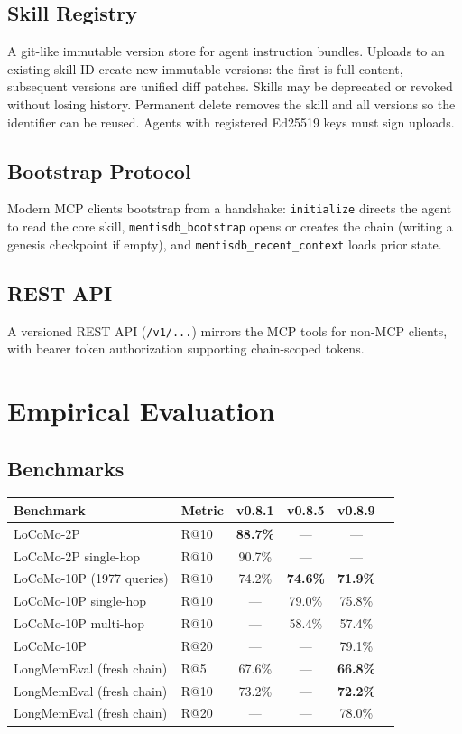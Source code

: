 \documentclass[11pt,a4paper]{article}
\begin{document}
\subsection{Skill Registry}

A git-like immutable version store for agent instruction bundles. Uploads to an existing
skill ID create new immutable versions: the first is full content, subsequent versions are
unified diff patches. Skills may be deprecated or revoked without losing history.
Permanent delete removes the skill and all versions so the identifier can be reused.
Agents with registered Ed25519 keys must sign uploads.

\subsection{Bootstrap Protocol}

Modern MCP clients bootstrap from a handshake: \texttt{initialize} directs the agent to
read the core skill, \texttt{mentisdb\_bootstrap} opens or creates the chain (writing a
genesis checkpoint if empty), and \texttt{mentisdb\_recent\_context} loads prior state.

\subsection{REST API}

A versioned REST API (\texttt{/v1/...}) mirrors the MCP tools for non-MCP clients, with
bearer token authorization supporting chain-scoped tokens.

\section{Empirical Evaluation}

\subsection{Benchmarks}

\begin{longtable}{llcccc}
\toprule
Benchmark & Metric & v0.8.1 & v0.8.5 & v0.8.9 \\
\midrule
LoCoMo-2P & R@10 & \textbf{88.7\%} & — & — \\
LoCoMo-2P single-hop & R@10 & 90.7\% & — & — \\
LoCoMo-10P (1977 queries) & R@10 & 74.2\% & \textbf{74.6\%} & \textbf{71.9\%} \\
LoCoMo-10P single-hop & R@10 & — & 79.0\% & 75.8\% \\
LoCoMo-10P multi-hop & R@10 & — & 58.4\% & 57.4\% \\
LoCoMo-10P & R@20 & — & — & 79.1\% \\
LongMemEval (fresh chain) & R@5 & 67.6\% & — & \textbf{66.8\%} \\
LongMemEval (fresh chain) & R@10 & 73.2\% & — & \textbf{72.2\%} \\
LongMemEval (fresh chain) & R@20 & — & — & 78.0\% \\
\bottomrule
\end{longtable}
\end{document}
